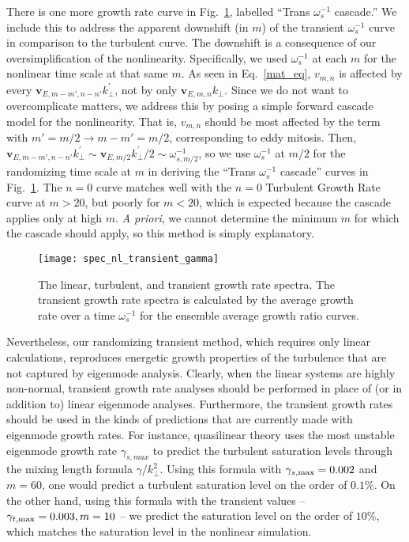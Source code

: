 \documentclass[showpacs,preprintnumbers,amsmath,amssymb,superscriptaddress,aip]{revtex4-1}
\begin{document}
There is one more growth rate curve in Fig.~\ref{spec_nl_transient_gamma}, labelled ``Trans $\omega_s^{-1}$ cascade.'' We include this to address the apparent downshift (in $m$) of
the transient $\omega_s^{-1}$ curve in comparison to the turbulent curve. The downshift is a consequence of our oversimplification of the nonlinearity. Specifically, we
used $\omega_s^{-1}$ at each $m$ for the nonlinear time scale at that same $m$. As seen in Eq.~\ref{mat_eq}, $v_{m,n}$ is affected by every $\mathbf{v}_{E,m-m',n-n'} k^{'}_\perp$, not by only
$\mathbf{v}_{E,m,n} k_\perp$. Since we do not want to overcomplicate matters, we address this by posing a simple forward cascade model for the nonlinearity. That is, $v_{m,n}$ should be
most affected by the term with $m' = m/2 \rightarrow m-m' = m/2$, corresponding to eddy mitosis. Then, $\mathbf{v}_{E,m-m',n-n'} k^{'}_\perp \sim \mathbf{v}_{E,m/2} k^{'}_\perp/2 \sim \omega_{s,m/2}^{-1}$, 
so we use $\omega_s^{-1}$ at $m/2$ for the randomizing time scale at $m$ in deriving the ``Trans $\omega_s^{-1}$ cascade'' curves in Fig.~\ref{spec_nl_transient_gamma}. 
The $n=0$ curve matches well with the $n=0$ Turbulent Growth Rate curve at $m>20$, but poorly for $m<20$, which is expected because the cascade applies only at high $m$. \emph{A priori}, we
cannot determine the minimum $m$ for which the cascade should apply, so this method is simply explanatory.

\begin{figure}
\centerline{\texttt{[image: spec\_nl\_transient\_gamma]}}
\caption{The linear, turbulent, and transient growth rate spectra. The transient growth rate spectra is calculated by the average growth rate over a time $\omega_s^{-1}$ for the ensemble average
growth ratio curves.}
\label{spec_nl_transient_gamma}
\end{figure}

Nevertheless, our randomizing transient method, which requires only linear calculations, reproduces energetic growth properties of the turbulence that are not captured by eigenmode analysis.
Clearly, when the linear systems are highly non-normal, transient growth rate analyses should be performed in place of (or in addition to) linear eigenmode analyses. 
Furthermore, the transient growth rates should be used in the kinds of predictions that are currently made with eigenmode growth rates. 
For instance, quasilinear theory uses the most unstable eigenmode growth rate $\gamma_{s,max}$ to predict the turbulent saturation levels through the mixing length formula $\gamma/k_\perp^2$. 
Using this formula with $\gamma_{s,\rm{max}} = 0.002$ and $m=60$, one would predict a turbulent saturation level on the order of $0.1 \%$. 
On the other hand, using this formula with the transient values -- $\gamma_{t,\rm{max}} = 0.003, m=10$ -- we predict the saturation level on the order of $10 \%$,
which matches the saturation level in the nonlinear simulation.
\end{document}
